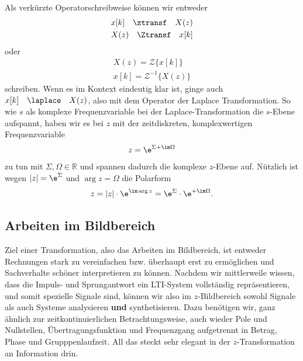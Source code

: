 Als verkürzte Operatorschreibweise können wir entweder
\begin{align}
x[k] \quad\ztransf\quad X(z)\\
X(z) \quad\Ztransf\quad x[k]
\end{align}
oder
\begin{align}
X(z) = \mathcal{Z}\{x[k]\} \\
x[k] = \mathcal{Z}^{-1}\{X(z)\}
\end{align}
schreiben.
Wenn es im Kontext eindeutig klar ist, ginge auch $x[k] \quad\laplace\quad X(z)$,
also mit dem Operator der Laplace Transformation.
%
So wie $s$ als komplexe Frequenzvariable bei der Laplace-Transformation die
$s$-Ebene aufspannt, haben wir es bei $z$ mit der zeitdiskreten, komplexwertigen
Frequenzvariable
\begin{align}
z = \e^{\Sigma + \im \Omega} %
\end{align}
zu tun mit $\Sigma,\Omega\in\mathbb{R}$ und spannen dadurch die komplexe $z$-Ebene auf.
%
Nützlich ist wegen $|z|=\e^{\Sigma}$ und $\arg z = \Omega$ die Polarform
\begin{align}
z = |z| \cdot \e^{\im \arg z} = \e^{\Sigma} \cdot \e^{+\im \Omega}.
\end{align}

\subsection*{Arbeiten im Bildbereich}
Ziel einer Transformation, also das Arbeiten im Bildbereich, ist
entweder Rechnungen stark zu vereinfachen bzw. überhaupt erst zu ermöglichen und
Sachverhalte schöner interpretieren zu können.
%
Nachdem wir mittlerweile wissen, dass die Impuls- und Sprungantwort ein LTI-System
vollständig repräsentieren, und somit spezielle
Signale sind, können wir also im $z$-Bildbereich sowohl Signale als auch Systeme
analysieren \textbf{und} synthetisieren.
%
Dazu benötigen wir, ganz ähnlich zur zeitkontinuierlichen Betrachtungsweise, auch
wieder Pole und Nullstellen, Übertragungsfunktion und Frequenzgang aufgetrennt
in Betrag, Phase und Grupppenlaufzeit.
%
All das steckt sehr elegant in der $z$-Transformation an Information drin.
%
